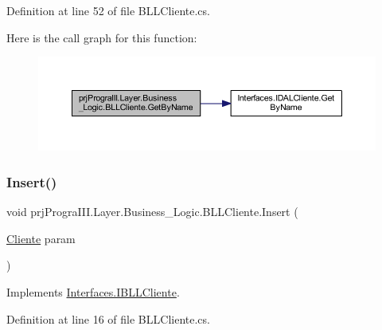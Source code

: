 Definition at line 52 of file B\+L\+L\+Cliente.\+cs.

Here is the call graph for this function\+:
\nopagebreak
\begin{figure}[H]
\begin{center}
\leavevmode
\includegraphics[width=350pt]{classprj_progra_i_i_i_1_1_layer_1_1_business___logic_1_1_b_l_l_cliente_a9963b076dc230773e81b866992a13a14_cgraph}
\end{center}
\end{figure}
\hypertarget{classprj_progra_i_i_i_1_1_layer_1_1_business___logic_1_1_b_l_l_cliente_a4412306e108649758d603cb510af7704}{}\label{classprj_progra_i_i_i_1_1_layer_1_1_business___logic_1_1_b_l_l_cliente_a4412306e108649758d603cb510af7704} 
\subsubsection{\texorpdfstring{Insert()}{Insert()}}
{\footnotesize\ttfamily void prj\+Progra\+I\+I\+I.\+Layer.\+Business\+\_\+\+Logic.\+B\+L\+L\+Cliente.\+Insert (\begin{DoxyParamCaption}\item[{\hyperlink{classprj_progra_i_i_i_1_1_layer_1_1_entities_1_1_cliente}{Cliente}}]{param }\end{DoxyParamCaption})}



Implements \hyperlink{interface_interfaces_1_1_i_b_l_l_cliente_aaf2e62f3c57006ecf12ba4559a70448d}{Interfaces.\+I\+B\+L\+L\+Cliente}.



Definition at line 16 of file B\+L\+L\+Cliente.\+cs.

